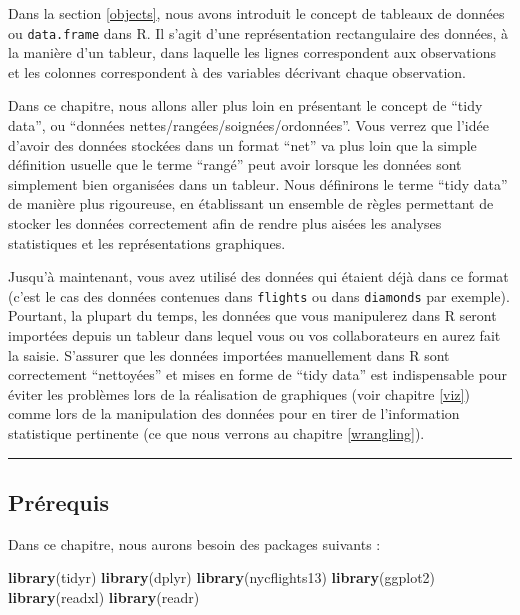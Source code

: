 \documentclass[a4paperpaper,]{article}
\newenvironment{Shaded}{\begin{snugshade}}{\end{snugshade}}
\newcommand{\KeywordTok}[1]{\textcolor[rgb]{0.12,0.11,0.11}{\textbf{#1}}}
\newcommand{\NormalTok}[1]{\textcolor[rgb]{0.12,0.11,0.11}{#1}}
\begin{document}
Dans la section \ref{objects}, nous avons introduit le concept de tableaux de données ou \texttt{data.frame} dans R. Il s'agit d'une représentation rectangulaire des données, à la manière d'un tableur, dans laquelle les lignes correspondent aux observations et les colonnes correspondent à des variables décrivant chaque observation.

Dans ce chapitre, nous allons aller plus loin en présentant le concept de ``tidy data'', ou ``données nettes/rangées/soignées/ordonnées''. Vous verrez que l'idée d'avoir des données stockées dans un format ``net'' va plus loin que la simple définition usuelle que le terme ``rangé'' peut avoir lorsque les données sont simplement bien organisées dans un tableur. Nous définirons le terme ``tidy data'' de manière plus rigoureuse, en établissant un ensemble de règles permettant de stocker les données correctement afin de rendre plus aisées les analyses statistiques et les représentations graphiques.

Jusqu'à maintenant, vous avez utilisé des données qui étaient déjà dans ce format (c'est le cas des données contenues dans \texttt{flights} ou dans \texttt{diamonds} par exemple). Pourtant, la plupart du temps, les données que vous manipulerez dans R seront importées depuis un tableur dans lequel vous ou vos collaborateurs en aurez fait la saisie. S'assurer que les données importées manuellement dans R sont correctement ``nettoyées'' et mises en forme de ``tidy data'' est indispensable pour éviter les problèmes lors de la réalisation de graphiques (voir chapitre \ref{viz}) comme lors de la manipulation des données pour en tirer de l'information statistique pertinente (ce que nous verrons au chapitre \ref{wrangling}).

\begin{center}\rule{0.5\linewidth}{\linethickness}\end{center}

\hypertarget{prerek}{%
\subsection{Prérequis}\label{prerek}}

Dans ce chapitre, nous aurons besoin des packages suivants :

\begin{Shaded}
\begin{Highlighting}[]
\KeywordTok{library}\NormalTok{(tidyr)}
\KeywordTok{library}\NormalTok{(dplyr)}
\KeywordTok{library}\NormalTok{(nycflights13)}
\KeywordTok{library}\NormalTok{(ggplot2)}
\KeywordTok{library}\NormalTok{(readxl)}
\KeywordTok{library}\NormalTok{(readr)}
\end{Highlighting}
\end{Shaded}
\end{document}
